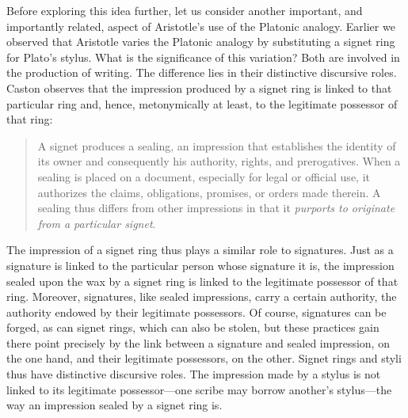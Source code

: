Before exploring this idea further, let us consider another important, and importantly related, aspect of Aristotle's use of the Platonic analogy. Earlier we observed that Aristotle varies the Platonic analogy by substituting a signet ring for Plato's stylus. What is the significance of this variation? Both are involved in the production of writing. The difference lies in their distinctive discursive roles. Caston observes that the impression produced by a signet ring is linked to that particular ring and, hence, metonymically at least, to the legitimate possessor of that ring:
\begin{quote}
	A signet produces a sealing, an impression that establishes the identity of its owner and consequently his authority, rights, and prerogatives. When a sealing is placed on a document, especially for legal or official use, it authorizes the claims, obligations, promises, or orders made therein. A sealing thus differs from other impressions in that it \emph{purports to originate from a particular signet}. \citep[302]{Caston:2005cr}
\end{quote}
The impression of a signet ring thus plays a similar role to signatures. Just as a signature is linked to the particular person whose signature it is, the impression sealed upon the wax by a signet ring is linked to the legitimate possessor of that ring. Moreover, signatures, like sealed impressions, carry a certain authority, the authority endowed by their legitimate possessors. Of course, signatures can be forged, as can signet rings, which can also be stolen, but these practices gain there point precisely by the link between a signature and sealed impression, on the one hand, and their legitimate possessors, on the other. Signet rings and styli thus have distinctive discursive roles. The impression made by a stylus is not linked to its legitimate possessor---one scribe may borrow another's stylus---the way an impression sealed by a signet ring is.

